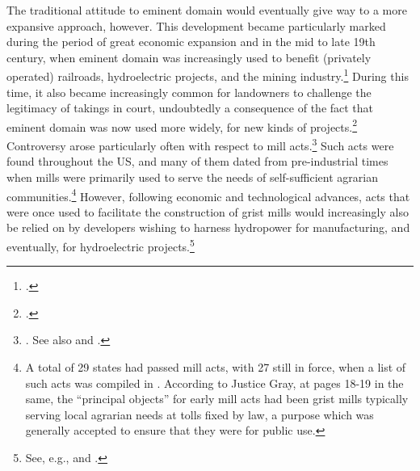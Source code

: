 
The traditional attitude to eminent domain would eventually give way to a more expansive approach, however. This development became particularly marked during the period of great economic expansion and  in the mid to late 19th century, when eminent domain was increasingly used to benefit (privately operated) railroads, hydroelectric projects, and the mining industry.\footcite[23-33]{meidinger80} During this time, it also became increasingly common for landowners to challenge the legitimacy of takings in court, undoubtedly a consequence of the fact that eminent domain was now used more widely, for new kinds of projects.\footcite[24]{meidinger80} Controversy arose particularly often with respect to mill acts.\footnote{\cite[24]{meidinger80}. See also \cite[306-313]{johnson11} and \cite[251-252]{horwitz73}.} Such acts were found throughout the US, and many of them dated from pre-industrial times when mills were primarily used to serve the needs of self-sufficient agrarian communities.\footnote{A total of 29 states had passed mill acts, with 27 still in force, when a list of such acts was compiled in \cite[17]{head85}. According to Justice Gray, at pages 18-19 in the same, the ``principal objects'' for early mill acts had been grist mills typically serving local agrarian needs at tolls fixed by law, a purpose which was generally accepted to ensure that they were for public use.}  However, following economic and technological advances, acts that were once used to facilitate the construction of grist mills would increasingly also be relied on by developers wishing to harness hydropower for manufacturing, and eventually, for hydroelectric projects.\footnote{See, e.g., \cite[18-21]{head85} and \cite[449-452]{minn06}.}

